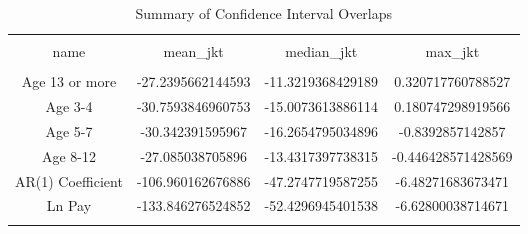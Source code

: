 
\begin{table}[!htbp] \centering 
  \caption{Summary of Confidence Interval Overlaps} 
  \label{tab:jkm} 
\begin{tabular}{@{\extracolsep{5pt}} cccc} 
\\[-1.8ex]\hline 
\hline \\[-1.8ex] 
name & mean\_jkt & median\_jkt & max\_jkt \\ 
\hline \\[-1.8ex] 
Age 13 or more & -27.2395662144593 & -11.3219368429189 & 0.320717760788527 \\ 
Age 3-4 & -30.7593846960753 & -15.0073613886114 & 0.180747298919566 \\ 
Age 5-7 & -30.342391595967 & -16.2654795034896 & -0.8392857142857 \\ 
Age 8-12 & -27.085038705896 & -13.4317397738315 & -0.446428571428569 \\ 
AR(1) Coefficient & -106.960162676886 & -47.2747719587255 & -6.48271683673471 \\ 
Ln Pay & -133.846276524852 & -52.4296945401538 & -6.62800038714671 \\ 
\hline \\[-1.8ex] 
\end{tabular} 
\end{table} 
